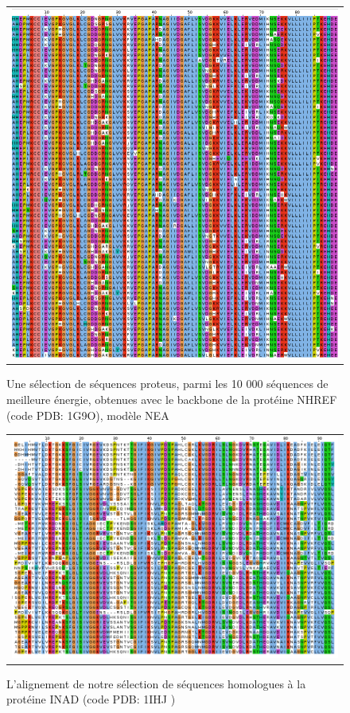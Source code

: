    \begin{figure}[t]
     \centering
     \begin{tabular}{c}
       \includegraphics[width=17cm]{proteus/1G9O.png} \\
     \end{tabular}
       \caption{Une sélection de séquences proteus, parmi les 10 000 séquences de meilleure énergie, obtenues avec le backbone de la protéine NHREF (code PDB: 1G9O), modèle NEA}
\label{align_proteus:NHREF}
   \end{figure}

\clearpage

   \begin{figure}[t]
     \centering
     \begin{tabular}{c}
       \includegraphics[width=17cm]{homologues/1IHJ.png} \\
     \end{tabular}
     \caption{L'alignement de notre sélection de séquences homologues à la protéine INAD (code PDB: 1IHJ )}
\label{align_homo:INAD}
   \end{figure}

